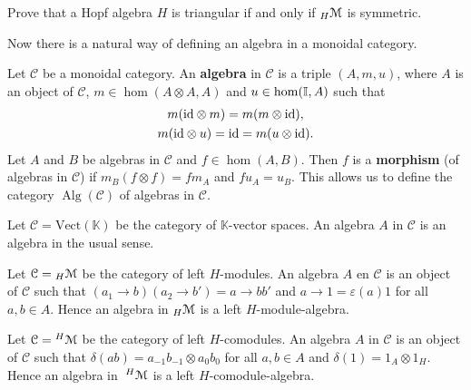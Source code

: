 \begin{exercise}\label{exercise:triangular}
Prove that a Hopf algebra $H$ is triangular if and only if ${}_{H}\mathcal{M}$ is
symmetric. 
\end{exercise}

Now there is a natural way of defining an algebra in a monoidal category. 

\begin{definition}
Let $\mathcal{C}$ be a monoidal category. An \textbf{algebra} in
$\mathcal{C}$ is a triple $(A,m,u)$, where $A$ is an object of
$\mathcal{C}$, $m\in\hom(A\otimes A,A)$ and $u\in\hom(\mathbb{I},A)$ such that 
\begin{gather*}
m(\mathrm{id}\otimes m)=m(m\otimes\mathrm{id}),\\
m(\mathrm{id}\otimes u)=\mathrm{id}=m(u\otimes\mathrm{id}).
\end{gather*}
Let $A$ and $B$ be algebras in $\mathcal{C}$ and $f\in\hom(A,B)$.
Then $f$ is a \textbf{morphism} (of algebras in $\mathcal{C}$)
if $m_{B}(f\otimes f)=fm_{A}$ and $fu_{A}=u_{B}$. This allows
us to define the category $\operatorname{Alg}(\mathcal{C})$
of algebras in $\mathcal{C}$. 
\end{definition}

\begin{example}
Let $\mathcal{C}=\mathrm{Vect}(\mathbb{K})$ be the category of
$\mathbb{K}$-vector spaces. An algebra $A$ in $\mathcal{C}$ is an algebra in
the usual sense.
\end{example}

\begin{example}
Let $\mathcal{C}={}_{H}\mathcal{M}$ be the category of left $H$-modules.  An algebra $A$
en $\mathcal{C}$ is an object of $\mathcal{C}$ such that $(a_{1}\to b)(a_{2}\to
b')=a\to bb'$ and $a\to1=\varepsilon(a)1$ for all $a,b\in A$. Hence an algebra
in ${}_{H}\mathcal{M}$ is a left $H$-module-algebra.
\end{example}

\begin{example}
Let $\mathcal{C=}\;^{H}\mathcal{M}$ be the category of left $H$-comodules.  An algebra
$A$ in $\mathcal{C}$ is an object of $\mathcal{C}$ such that
$\delta(ab)=a_{-1}b{}_{-1}\otimes a_{0}b{}_{0}$ for all $a,b\in A$ and
$\delta(1)=1_{A}\otimes1_{H}$.  Hence an algebra in $\;^{H}\mathcal{M}$ is a left
$H$-comodule-algebra.
\end{example}

